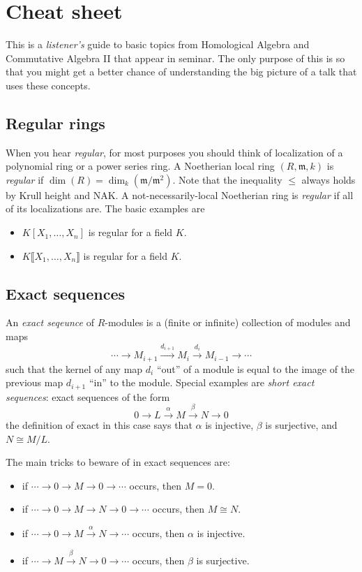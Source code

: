 \documentclass[12pt]{amsart}
\newcommand{\m}{\mathfrak{m}}
\begin{document}
	

	
\section*{Cheat sheet}

This is a \emph{listener's} guide to basic topics from Homological Algebra and Commutative Algebra \textsc{II} that appear in seminar. The only purpose of this is so that you might get a better chance of understanding the big picture of a talk that uses these concepts.



\subsection*{Regular rings} When you hear \emph{regular}, for most purposes you should think of localization of a polynomial ring or a power series ring. A Noetherian local ring $(R,\m,k)$ is \emph{regular} if $\dim(R) = \dim_{k}(\m/\m^2)$. Note that the inequality $\leq$ always holds by Krull height and NAK. A not-necessarily-local Noetherian ring is \emph{regular} if all of its localizations are. The basic examples are
\begin{itemize}
\item $K[X_1,\dots,X_n]$ is regular for a field $K$.
\item $K\llbracket X_1,\dots,X_n\rrbracket$ is regular for a field $K$.
\end{itemize}


\subsection*{Exact sequences} An \emph{exact seqeunce} of $R$-modules is 
a (finite or infinite) collection of modules and maps
\[ \cdots  \rightarrow M_{i+1} \xrightarrow{d_{i+1}} M_{i} \xrightarrow{d_{i}} M_{i-1} \rightarrow \cdots\]
such that the kernel of any map  $d_{i}$  ``out'' of a module is equal to the image of the previous map $d_{i+1}$ ``in'' to the module. Special examples are \emph{short exact sequences}: exact sequences of the form
\[ 0  \rightarrow L \xrightarrow{\alpha} M \xrightarrow{\beta} N \rightarrow 0\]
the definition of exact in this case says that $\alpha$ is injective, $\beta$ is surjective, and $N\cong M/L$.

The main tricks to beware of in exact sequences are:
\begin{itemize}
\item if $\cdots \to  0 \to M \to 0 \to \cdots$ occurs, then $M=0$.
\item if $\cdots \to  0 \to M \to N \to 0 \to \cdots$ occurs, then $M\cong N$.
\item if $\cdots \to  0 \to M \xrightarrow{\alpha} N \to \cdots$ occurs, then $\alpha$ is injective.
\item if $\cdots \to  M \xrightarrow{\beta} N \to 0 \to  \cdots$ occurs, then $\beta$ is surjective.
\end{itemize}
\end{document}
